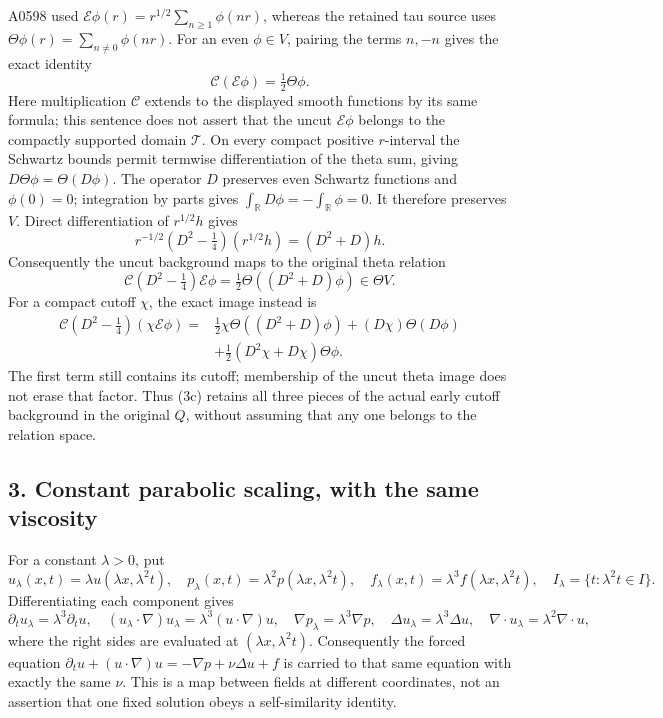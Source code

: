 A0598 used \(\mathcal E\phi(r)=r^{1/2}\sum_{n\ge1}\phi(nr)\), whereas
the retained tau source uses \(\Theta\phi(r)=\sum_{n\ne0}\phi(nr)\). For
an even \(\phi\in V\), pairing the terms \(n,-n\) gives the exact
identity \[
\mathcal C(\mathcal E\phi)=\tfrac12\Theta\phi.
\tag{3a}
\] Here multiplication \(\mathcal C\) extends to the displayed smooth
functions by its same formula; this sentence does not assert that the
uncut \(\mathcal E\phi\) belongs to the compactly supported domain
\(\mathscr T\). On every compact positive \(r\)-interval the Schwartz
bounds permit termwise differentiation of the theta sum, giving
\(D\Theta\phi=\Theta(D\phi)\). The operator \(D\) preserves even
Schwartz functions and \(\phi(0)=0\); integration by parts gives
\(\int_{\mathbb R} D\phi=-\int_{\mathbb R}\phi=0\). It therefore preserves
\(V\). Direct differentiation of \(r^{1/2}h\) gives \[
r^{-1/2}(D^2-\tfrac14)(r^{1/2}h)=(D^2+D)h.
\] Consequently the uncut background maps to the original theta relation
\[
\mathcal C(D^2-\tfrac14)\mathcal E\phi=\tfrac12\Theta((D^2+D)\phi)\in\Theta V.
\tag{3b}
\] For a compact cutoff \(\chi\), the exact image instead is \[
\begin{aligned}
\mathcal C(D^2-\tfrac14)(\chi\mathcal E\phi)
={}&\tfrac12\chi\Theta((D^2+D)\phi)
+(D\chi)\Theta(D\phi)\\
&+\tfrac12(D^2\chi+D\chi)\Theta\phi.
\end{aligned}
\tag{3c}
\] The first term still contains its cutoff; membership of the uncut
theta image does not erase that factor. Thus (3c) retains all three
pieces of the actual early cutoff background in the original \(Q\),
without assuming that any one belongs to the relation space.

\subsection{3. Constant parabolic scaling, with the same
viscosity}\label{proof09:constant-parabolic-scaling-with-the-same-viscosity}

For a constant \(\lambda>0\), put \[
u_\lambda(x,t)=\lambda u(\lambda x,\lambda^2t),\quad
p_\lambda(x,t)=\lambda^2p(\lambda x,\lambda^2t),\quad
f_\lambda(x,t)=\lambda^3f(\lambda x,\lambda^2t),
\quad I_\lambda=\{t:\lambda^2t\in I\}.
\] Differentiating each component gives \[
\partial_tu_\lambda=\lambda^3\partial_tu,\quad
(u_\lambda\cdot\nabla)u_\lambda=\lambda^3(u\cdot\nabla)u,\quad
\nabla p_\lambda=\lambda^3\nabla p,\quad
\Delta u_\lambda=\lambda^3\Delta u,
\quad \nabla\cdot u_\lambda=\lambda^2\nabla\cdot u,
\] where the right sides are evaluated at \((\lambda x,\lambda^2t)\).
Consequently the forced equation
\(\partial_tu+(u\cdot\nabla)u=-\nabla p+\nu\Delta u+f\) is carried to
that same equation with exactly the same \(\nu\). This is a map between
fields at different coordinates, not an assertion that one fixed
solution obeys a self-similarity identity.

